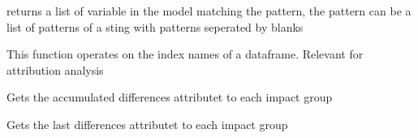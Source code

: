 \documentclass[letterpaper,10pt,english]{sphinxmanual}
\begin{document}

\begin{fulllineitems}
\label{\detokenize{index:modeldekom.ilist}}
\pysigstartsignatures
{}
\pysigstopsignatures
\sphinxAtStartPar
returns a list of variable in the model matching the pattern,
the pattern can be a list of patterns of a sting with patterns seperated by
blanks

\sphinxAtStartPar
This function operates on the index names of a dataframe. Relevant for attribution analysis

\end{fulllineitems}


\begin{fulllineitems}
\label{\detokenize{index:modeldekom.GetSumImpact}}
\pysigstartsignatures
{}
\pysigstopsignatures
\sphinxAtStartPar
Gets the accumulated differences attributet to each impact group

\end{fulllineitems}


\begin{fulllineitems}
\label{\detokenize{index:modeldekom.GetLastImpact}}
\pysigstartsignatures
{}
\pysigstopsignatures
\sphinxAtStartPar
Gets the last differences attributet to each impact group

\end{fulllineitems}

\end{document}
